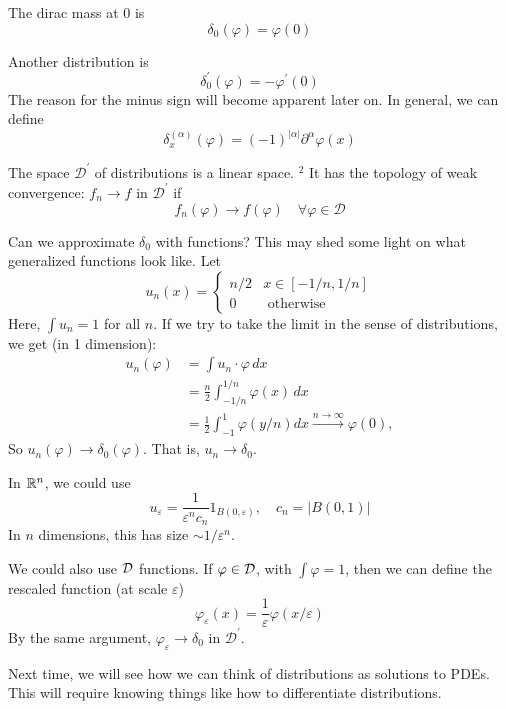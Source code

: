 \begin{example}
    The dirac mass at 0 is 
    \[
        \delta_{0}(\varphi)=\varphi(0)
    \]
\end{example}

\begin{example}
    Another distribution is 
    $$
    \delta_{0}^{\prime}(\varphi)=-\varphi^{\prime}(0)
    $$
    The reason for the minus sign will become apparent later on. In general, we can define
    $$
    \delta_{x}^{(\alpha)}(\varphi)=(-1)^{|\alpha|} \partial^{\alpha} \varphi(x)
    $$
\end{example}
The space $\mathcal{D}^{\prime}$ of distributions is a linear space. ${ }^{2}$ It has the topology of weak convergence: $f_{n} \rightarrow f$ in $\mathcal{D}^{\prime}$ if
$$
f_{n}(\varphi) \rightarrow f(\varphi) \quad \forall \varphi \in \mathcal{D}
$$

\begin{example}
    Can we approximate $\delta_0$ with functions? This may shed some light on what generalized functions look like. Let 
    \[
        u_{n}(x)= \begin{cases}n / 2 & x \in[-1 / n, 1 / n] \\ 0 & \text { otherwise }\end{cases}
    \]
    Here, $\int u_{n}=1$ for all $n$. If we try to take the limit in the sense of distributions, we get (in 1 dimension):
\begin{align*}
    u_{n}(\varphi)&=\int u_{n} \cdot \varphi\, d x\\ 
    & = \frac n 2 \int_{-1/n}^{1/n} \varphi(x)\, dx \\
    & = \frac 1 2 \int_{-1}^1 \varphi(y/n) dx \stackrel{n \to \infty}{\longrightarrow} \varphi(0),
\end{align*}
So $u_n(\varphi) \to \delta_0 (\varphi)$. That is, $u_n \to \delta_0$.
\end{example}

\begin{remark}
    In $\mathbb{R}^n$, we could use
    $$
u_{\varepsilon}=\frac{1}{\varepsilon^{n} c_{n}} 1_{B(0, \varepsilon)}, \quad c_{n}=|B(0,1)|
$$
In $n$ dimensions, this has size $\sim 1 / \varepsilon^{n}$. 
\end{remark}

\begin{remark}
We could also use $\mathcal{D}$ functions. If $\varphi \in \mathcal{D}$, with $\int \varphi = 1$, then we can define the rescaled function (at scale $\varepsilon$)
\[
    \varphi_{\varepsilon}(x)=\frac{1}{\varepsilon} \varphi(x / \varepsilon)
\]
By the same argument, $\varphi_{\varepsilon} \rightarrow \delta_{0}$ in $\mathcal{D}^{\prime}$.
\end{remark}
Next time, we will see how we can think of distributions as solutions to PDEs. This will require knowing things like how to differentiate distributions.
